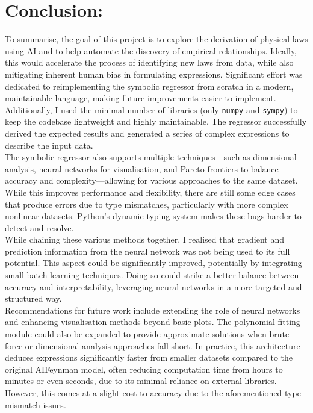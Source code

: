 \documentclass{article}
\begin{document}
\section{Conclusion: }




To summarise, the goal of this project is to explore the derivation of physical laws using AI and to help automate the discovery of empirical relationships. Ideally, this would accelerate the process of identifying new laws from data, while also mitigating inherent human bias in formulating expressions. Significant effort was dedicated to reimplementing the symbolic regressor from scratch in a modern, maintainable language, making future improvements easier to implement. Additionally, I used the minimal number of libraries (only \texttt{numpy} and \texttt{sympy}) to keep the codebase lightweight and highly maintainable. The regressor successfully derived the expected results and generated a series of complex expressions to describe the input data. \\

The symbolic regressor also supports multiple techniques—such as dimensional analysis, neural networks for visualisation, and Pareto frontiers to balance accuracy and complexity—allowing for various approaches to the same dataset. While this improves performance and flexibility, there are still some edge cases that produce errors due to type mismatches, particularly with more complex nonlinear datasets. Python's dynamic typing system makes these bugs harder to detect and resolve. \\

While chaining these various methods together, I realised that gradient and prediction information from the neural network was not being used to its full potential. This aspect could be significantly improved, potentially by integrating small-batch learning techniques. Doing so could strike a better balance between accuracy and interpretability, leveraging neural networks in a more targeted and structured way. \\

Recommendations for future work include extending the role of neural networks and enhancing visualisation methods beyond basic plots. The polynomial fitting module could also be expanded to provide approximate solutions when brute-force or dimensional analysis approaches fall short. In practice, this architecture deduces expressions significantly faster from smaller datasets compared to the original AIFeynman model, often reducing computation time from hours to minutes or even seconds, due to its minimal reliance on external libraries. However, this comes at a slight cost to accuracy due to the aforementioned type mismatch issues. \\
\end{document}
